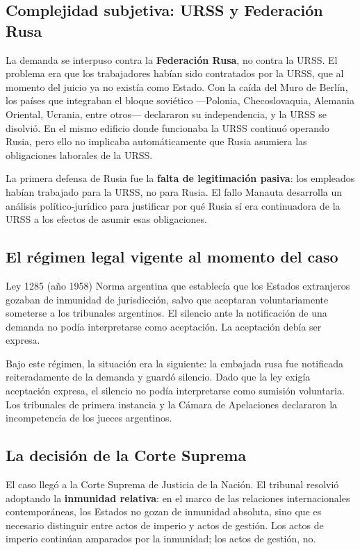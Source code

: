 \documentclass[12pt,oneside]{book}
\begin{document}
\subsection{Complejidad subjetiva: URSS y Federación Rusa}

La demanda se interpuso contra la \textbf{Federación Rusa}, no contra la URSS. El problema era que los trabajadores habían sido contratados por la URSS, que al momento del juicio ya no existía como Estado. Con la caída del Muro de Berlín, los países que integraban el bloque soviético —Polonia, Checoslovaquia, Alemania Oriental, Ucrania, entre otros— declararon su independencia, y la URSS se disolvió. En el mismo edificio donde funcionaba la URSS continuó operando Rusia, pero ello no implicaba automáticamente que Rusia asumiera las obligaciones laborales de la URSS.

La primera defensa de Rusia fue la \textbf{falta de legitimación pasiva}: los empleados habían trabajado para la URSS, no para Rusia. El fallo Manauta desarrolla un análisis político-jurídico para justificar por qué Rusia sí era continuadora de la URSS a los efectos de asumir esas obligaciones.

\subsection{El régimen legal vigente al momento del caso}

\begin{definition}{Ley 1285 (año 1958)}
Norma argentina que establecía que los Estados extranjeros gozaban de inmunidad de jurisdicción, salvo que aceptaran voluntariamente someterse a los tribunales argentinos. El silencio ante la notificación de una demanda no podía interpretarse como aceptación. La aceptación debía ser expresa.
\end{definition}

Bajo este régimen, la situación era la siguiente: la embajada rusa fue notificada reiteradamente de la demanda y guardó silencio. Dado que la ley exigía aceptación expresa, el silencio no podía interpretarse como sumisión voluntaria. Los tribunales de primera instancia y la Cámara de Apelaciones declararon la incompetencia de los jueces argentinos.

\subsection{La decisión de la Corte Suprema}

El caso llegó a la Corte Suprema de Justicia de la Nación. El tribunal resolvió adoptando la \textbf{inmunidad relativa}: en el marco de las relaciones internacionales contemporáneas, los Estados no gozan de inmunidad absoluta, sino que es necesario distinguir entre actos de imperio y actos de gestión. Los actos de imperio continúan amparados por la inmunidad; los actos de gestión, no.
\end{document}

